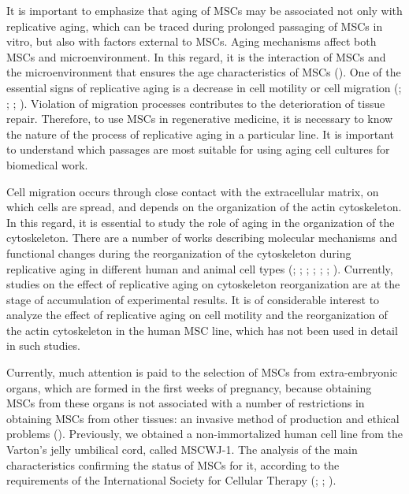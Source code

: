 \documentclass[english,authoryear]{elsarticle}
\begin{document}
It is important to emphasize that aging of MSCs may be associated not only with replicative aging, which can be traced during prolonged passaging of MSCs in vitro, but also with factors external to MSCs.
Aging mechanisms affect both MSCs and microenvironment.
In this regard, it is the interaction of MSCs and the microenvironment that ensures the age characteristics of MSCs (\cite{sethe2006aging}).
One of the essential signs of replicative aging is a decrease in cell motility or cell migration (\cite{geissler2012functional}; \cite{bertolo2015vitro}; \cite{turinetto2016senescence}; \cite{zhang2018overexpression}).
Violation of migration processes contributes to the deterioration of tissue repair.
Therefore, to use MSCs in regenerative medicine, it is necessary to know the nature of the process of replicative aging in a particular line.
It is important to understand which passages are most suitable for using aging cell cultures for biomedical work.


Cell migration occurs through close contact with the extracellular matrix, on which cells are spread, and depends on the organization of the actin cytoskeleton.
In this regard, it is essential to study the role of aging in the organization of the cytoskeleton.
There are a number of works describing molecular mechanisms and functional changes during the reorganization of the cytoskeleton during replicative aging in different human and animal cell types (\cite{larsen2003phosphatases}; \cite{le2008regulation}; \cite{wang2009protein}; \cite{geissler2012functional}; \cite{ozcan2016unbiased}; \cite{turinetto2016senescence}; \cite{moujaber2019cellular}).
Currently, studies on the effect of replicative aging on cytoskeleton reorganization are at the stage of accumulation of experimental results.
It is of considerable interest to analyze the effect of replicative aging on cell motility and the reorganization of the actin cytoskeleton in the human MSC line, which has not been used in detail in such studies.


Currently, much attention is paid to the selection of MSCs from extra-embryonic organs, which are formed in the first weeks of pregnancy, because obtaining MSCs from these organs is not associated with a number of restrictions in obtaining MSCs from other tissues: an invasive method of production and ethical problems (\cite{bongso2013therapeutic}).
Previously, we obtained a non-immortalized human cell line from the Varton's jelly umbilical cord, called MSCWJ-1.
The analysis of the main characteristics confirming the status of MSCs for it, according to the requirements of the International Society for Cellular Therapy (\cite{dominici2006minimal}; \cite{sensebe2010mesenchymal}; \cite{krylova2017derivation}).
\end{document}
